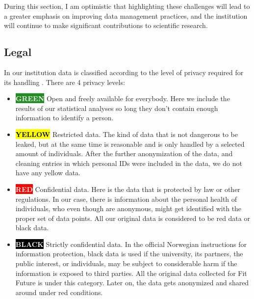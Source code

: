 During this section, I am optimistic that highlighting these challenges will lead to a greater emphasis on improving data management practices, and the institution will continue to make significant contributions to scientific research.


\subsection{Legal}


In our institution data is classified according to the level of privacy required for its handling  \cite{ref:DataColors}. There are 4 privacy levels:

\begin{itemize}

	\item \colorbox{ForestGreen}{\textcolor{white}{\textbf{GREEN}}} Open and freely available for everybody. Here we include the results of our statistical analyses so long they don't contain enough information to identify a person.
	
	\item \colorbox{Yellow}{\textcolor{black}{\textbf{YELLOW}}} Restricted data. The kind of data that is not dangerous to be leaked, but at the same time is reasonable and is only handled by a selected amount of individuals. After the further anonymization of the data, and cleaning entries in which personal IDs were included in the data, we do not have any yellow data.
	
	\item \colorbox{Red}{\textcolor{white}{\textbf{RED}}} Confidential data. Here is the data that is protected by law or other regulations. In our case, there is information about the personal health of individuals, who even though are anonymous, might get identified with the proper set of data points. All our original data is considered to be red data or black data.
	
	\item \colorbox{Black}{\textcolor{white}{\textbf{BLACK}}} Strictly confidential data. In the official Norwegian instructions for information protection, black data is used if the university, its partners, the public interest, or individuals, may be subject to considerable harm if the information is exposed to third parties. All the original data collected for Fit Future is under this category. Later on, the data gets anonymized and shared around under red conditions.
	
\end{itemize}


